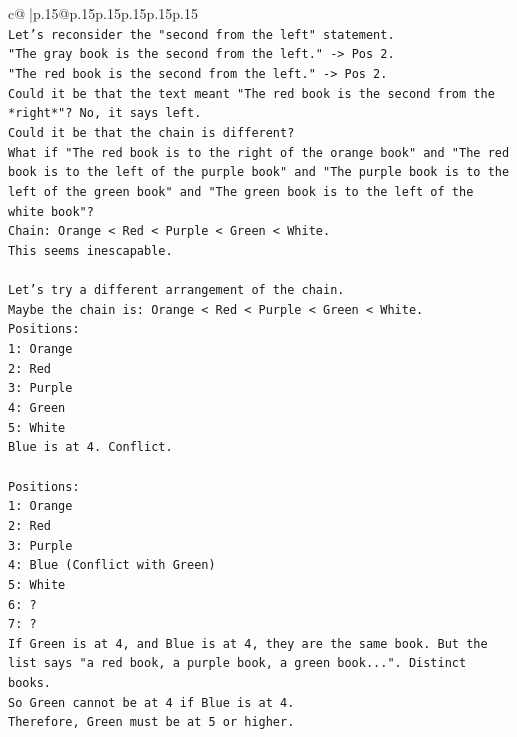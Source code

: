 \documentclass{article}
\begin{document}
{\begin{supertabular}{c@{$\;$}|p{.15\linewidth}@{}p{.15\linewidth}p{.15\linewidth}p{.15\linewidth}p{.15\linewidth}p{.15\linewidth}}
{{{\\ 
\texttt{Let's reconsider the "second from the left" statement.} \\
\texttt{"The gray book is the second from the left." {-}> Pos 2.} \\
\texttt{"The red book is the second from the left." {-}> Pos 2.} \\
\texttt{Could it be that the text meant "The red book is the second from the *right*"? No, it says left.} \\
\texttt{Could it be that the chain is different?} \\
\texttt{What if "The red book is to the right of the orange book" and "The red book is to the left of the purple book" and "The purple book is to the left of the green book" and "The green book is to the left of the white book"?} \\
\texttt{Chain: Orange < Red < Purple < Green < White.} \\
\texttt{This seems inescapable.} \\
\\ 
\texttt{Let's try a different arrangement of the chain.} \\
\texttt{Maybe the chain is: Orange < Red < Purple < Green < White.} \\
\texttt{Positions:} \\
\texttt{1: Orange} \\
\texttt{2: Red} \\
\texttt{3: Purple} \\
\texttt{4: Green} \\
\texttt{5: White} \\
\texttt{Blue is at 4. Conflict.} \\
\\ 
\texttt{Positions:} \\
\texttt{1: Orange} \\
\texttt{2: Red} \\
\texttt{3: Purple} \\
\texttt{4: Blue (Conflict with Green)} \\
\texttt{5: White} \\
\texttt{6: ?} \\
\texttt{7: ?} \\
\texttt{If Green is at 4, and Blue is at 4, they are the same book. But the list says "a red book, a purple book, a green book...". Distinct books.} \\
\texttt{So Green cannot be at 4 if Blue is at 4.} \\
\texttt{Therefore, Green must be at 5 or higher.} \\
}}}
\end{supertabular}}
\end{document}
